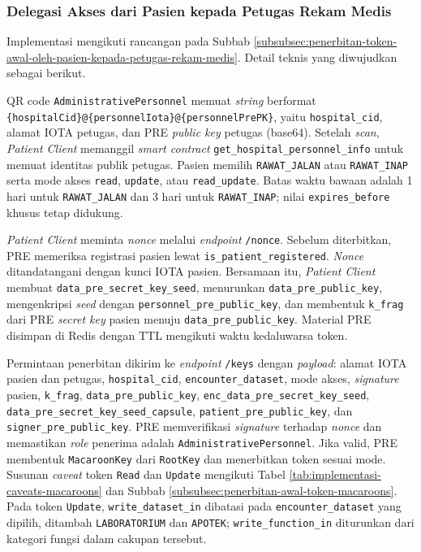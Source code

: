 \documentclass[bahasa, 12pt, a4paper, onecolumn, oneside, final]{report}
\begin{document}
\subsubsection{Delegasi Akses dari Pasien kepada Petugas Rekam Medis}
\label{subsubsec:delegasi-akses-dari-pasien-kepada-petugas-rekam-medis}

Implementasi mengikuti rancangan pada Subbab \ref{subsubsec:penerbitan-token-awal-oleh-pasien-kepada-petugas-rekam-medis}. Detail teknis yang diwujudkan sebagai berikut.

QR code \texttt{AdministrativePersonnel} memuat \textit{string} berformat \verb|{hospitalCid}@{personnelIota}@{personnelPrePK}|, yaitu \texttt{hospital\_cid}, alamat IOTA petugas, dan PRE \textit{public key} petugas (base64). Setelah \textit{scan}, \textit{Patient Client} memanggil \textit{smart contract} \verb|get_hospital_personnel_info| untuk memuat identitas publik petugas. Pasien memilih \texttt{RAWAT\_JALAN} atau \texttt{RAWAT\_INAP} serta mode akses \texttt{read}, \texttt{update}, atau \texttt{read\_update}. Batas waktu bawaan adalah 1 hari untuk \texttt{RAWAT\_JALAN} dan 3 hari untuk \texttt{RAWAT\_INAP}; nilai \texttt{expires\_before} khusus tetap didukung.

\textit{Patient Client} meminta \textit{nonce} melalui \textit{endpoint} \texttt{/nonce}. Sebelum diterbitkan, PRE memeriksa registrasi pasien lewat \verb|is_patient_registered|. \textit{Nonce} ditandatangani dengan kunci IOTA pasien. Bersamaan itu, \textit{Patient Client} membuat \texttt{data\_pre\_secret\_key\_seed}, menurunkan \texttt{data\_pre\_public\_key}, mengenkripsi \textit{seed} dengan \texttt{personnel\_pre\_public\_key}, dan membentuk \texttt{k\_frag} dari PRE \textit{secret key} pasien menuju \texttt{data\_pre\_public\_key}. Material PRE disimpan di Redis dengan TTL mengikuti waktu kedaluwarsa token.

Permintaan penerbitan dikirim ke \textit{endpoint} \texttt{/keys} dengan \textit{payload}: alamat IOTA pasien dan petugas, \texttt{hospital\_cid}, \texttt{encounter\_dataset}, mode akses, \textit{signature} pasien, \texttt{k\_frag}, \texttt{data\_pre\_public\_key}, \texttt{enc\_data\_pre\_secret\_key\_seed}, \texttt{data\_pre\_secret\_key\_seed\_capsule}, \texttt{patient\_pre\_public\_key}, dan \texttt{signer\_pre\_public\_key}. PRE memverifikasi \textit{signature} terhadap \textit{nonce} dan memastikan \textit{role} penerima adalah \texttt{AdministrativePersonnel}. Jika valid, PRE membentuk \texttt{MacaroonKey} dari \texttt{RootKey} dan menerbitkan token sesuai mode. Susunan \textit{caveat} token \texttt{Read} dan \texttt{Update} mengikuti Tabel \ref{tab:implementasi-caveats-macaroons} dan Subbab \ref{subsubsec:penerbitan-awal-token-macaroons}. Pada token \texttt{Update}, \texttt{write\_dataset\_in} dibatasi pada \texttt{encounter\_dataset} yang dipilih, ditambah \texttt{LABORATORIUM} dan \texttt{APOTEK}; \texttt{write\_function\_in} diturunkan dari kategori fungsi dalam cakupan tersebut.
\end{document}
